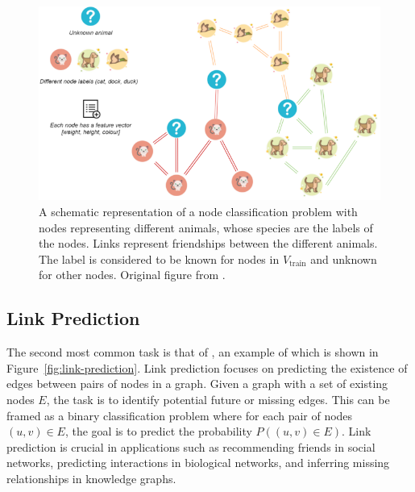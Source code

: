 \begin{figure}
	\includegraphics[width=\linewidth]{images/graph-tasks/node-classification.png}
	\caption{A schematic representation of a node classification problem with nodes representing different animals, whose species are the labels of the nodes. Links represent friendships between the different animals. The label is considered to be known for nodes in \( V_\mathrm{train} \) and unknown for other nodes. Original figure from \cite{kubara_machine_2020}.}
	\label{fig:node-classification}
\end{figure}

\subsection{Link Prediction}

The second most common task is that of , an example of which is shown in Figure~\ref{fig:link-prediction}. Link prediction focuses on predicting the existence of edges between pairs of nodes in a graph. Given a graph with a set of existing nodes \( E \), the task is to identify potential future or missing edges. This can be framed as a binary classification problem where for each pair of nodes \( (u, v) \in E \), the goal is to predict the probability \( P((u, v) \in E) \). Link prediction is crucial in applications such as recommending friends in social networks, predicting interactions in biological networks, and inferring missing relationships in knowledge graphs.  

